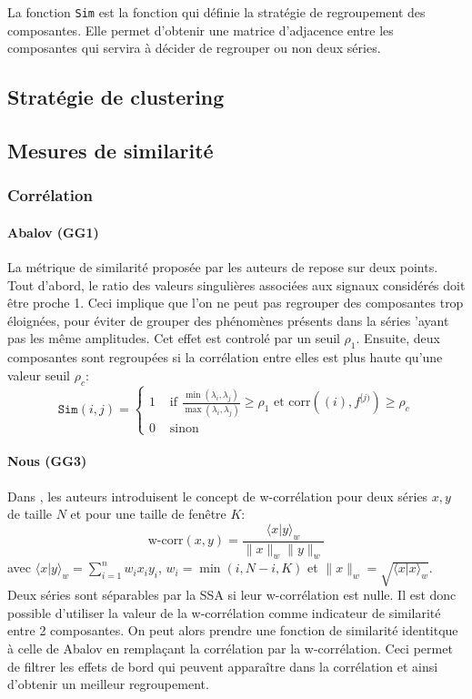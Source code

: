\documentclass{gretsi}
\begin{document}
La fonction \texttt{Sim} est la fonction qui définie la stratégie de regroupement des composantes. Elle permet d'obtenir une matrice d'adjacence entre les composantes qui servira à décider de regrouper ou non deux séries.\\

\subsection{Stratégie de clustering}
\label{sub:}


\subsection{Mesures de similarité}
\label{sub:}


\subsubsection{Corrélation}

\paragraph{Abalov (GG1)}
\label{par:}
La métrique de similarité proposée par les auteurs de \cite{abalov_14_aut} repose sur deux points. Tout d'abord, le ratio des valeurs singulières associées aux signaux considérés doit être proche 1. Ceci implique que l'on ne peut pas regrouper des composantes trop éloignées, pour éviter de grouper des phénomènes présents dans la séries 'ayant pas les même amplitudes. Cet effet est controlé par un seuil $\rho_1$. Ensuite, deux composantes sont regroupées si la corrélation entre elles est plus haute qu'une valeur seuil $\rho_c$:
$$
\texttt{Sim}(i, j) = \begin{cases}
	1 &\text{ if } \displaystyle\frac{\min(\lambda_i, \lambda_j)}{\max(\lambda_i, \lambda_j)} \ge \rho_1 \text{ et } \text{corr}({(i)}, f^{[j)}) \ge \rho_c\\
	0& \text{ sinon}
\end{cases}
$$

\paragraph{Nous (GG3)}
\label{par:nn}

Dans \cite{GNZ_10_SSA}, les auteurs introduisent le concept de w-corrélation pour deux séries $x, y$ de taille $N$ et pour une taille de fenêtre $K$:$$
\text{w-corr}(x, y) = \frac{\langle x|y\rangle_w}{\|x\|_w\|y\|_w}
$$avec $\langle x|y\rangle_w = \sum_{i=1}^n w_i x_i y_i$, $w_i = \min(i, N-i, K)$ et $\|x\|_w = \sqrt{\langle x|x\rangle_w}$. Deux séries sont séparables par la SSA si leur w-corrélation est nulle. Il est donc possible d'utiliser la valeur de la w-corrélation comme indicateur de similarité entre 2 composantes. On peut alors prendre une fonction de similarité identitque à celle de Abalov en remplaçant la corrélation par la w-corrélation. Ceci permet de filtrer les effets de bord qui peuvent apparaître dans la corrélation et ainsi d'obtenir un meilleur regroupement.
\end{document}
